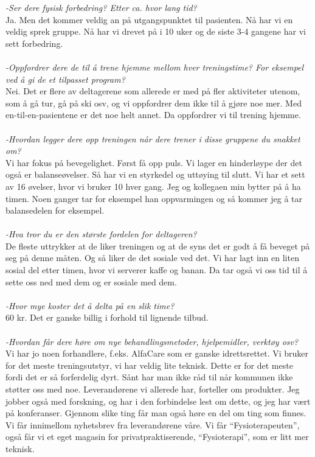 \emph{-Ser dere fysisk forbedring? Etter ca. hvor lang tid?}\\
Ja. Men det kommer veldig an på utgangspunktet til pasienten. Nå har vi en veldig sprek gruppe. Nå har vi drevet på i 10 uker og de siste 3-4 gangene har vi sett forbedring. \\ \\
\emph{-Oppfordrer dere de til å trene hjemme mellom hver treningstime? For eksempel ved å gi de et tilpasset program?}\\
Nei. Det er flere av deltagerene som allerede er med på fler aktiviteter utenom, som å gå tur, gå på ski osv, og vi oppfordrer dem ikke til å gjøre noe mer. Med en-til-en-pasientene er det noe helt annet. Da oppfordrer vi til trening hjemme. \\ \\
\emph{-Hvordan legger dere opp treningen når dere trener i disse gruppene du snakket om?} \\
Vi har fokus på bevegelighet. Først få opp puls. Vi lager en hinderløype der det også er balanseøvelser. Så har vi en styrkedel og uttøying til slutt. Vi har et sett av 16 øvelser, hvor vi bruker 10 hver gang. Jeg og kollegaen min bytter på å ha timen. Noen ganger tar for eksempel han oppvarmingen og så kommer jeg å tar balansedelen for eksempel. \\ \\
\emph{-Hva tror du er den største fordelen for deltageren?}\\
De fleste uttrykker at de liker treningen og at de syns det er godt å få beveget på seg på denne måten. Og så liker de det sosiale ved det. Vi har lagt inn en liten sosial del etter timen, hvor vi serverer kaffe og banan. Da tar også vi oss tid til å sette oss ned med dem og er sosiale med dem. \\ \\
\emph{-Hvor mye koster det å delta på en slik time?}\\
60 kr. Det er ganske billig i forhold til lignende tilbud. \\ \\
\emph{-Hvordan får dere høre om nye behandlingsmetoder, hjelpemidler, verktøy osv?} \\
Vi har jo noen forhandlere, f.eks. AlfaCare som er ganske idrettsrettet. Vi bruker for det meste treningsutstyr, vi har veldig lite teknisk. Dette er for det meste fordi det er så forferdelig dyrt. Sånt har man ikke råd til når kommunen ikke støtter oss med noe. Leverandørene vi allerede har, forteller om produkter. Jeg jobber også med forskning, og har i den forbindelse lest om dette, og jeg har vært på konferanser. Gjennom slike ting får man også høre en del om ting som finnes. Vi får innimellom nyhetsbrev fra leverandørene våre. Vi får “Fysioterapeuten”, også får vi et eget magasin for privatpraktiserende, “Fysioterapi”, som er litt mer teknisk. \\ \\
